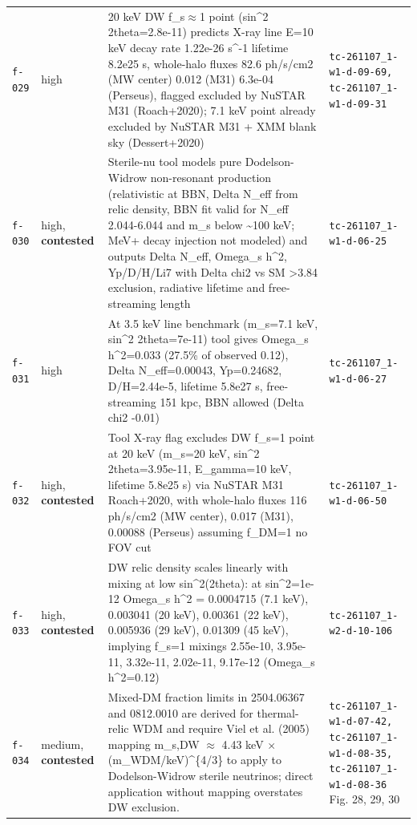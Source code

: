 \documentclass[11pt,a4paper]{article}
\begin{document}
\begin{longtable}{@{}p{}p{}p{}p{}@{}}
\texttt{f-029} & high & 20 keV DW f\_s$\approx$1 point (sin\textasciicircum{}2 2theta=2.8e-11) predicts X-ray line E=10 keV decay rate 1.22e-26 s\textasciicircum{}-1 lifetime 8.2e25 s, whole-halo fluxes 82.6 ph/s/cm2 (MW center) 0.012 (M31) 6.3e-04 (Perseus), flagged excluded by NuSTAR M31 (Roach+2020); 7.1 keV point already excluded by NuSTAR M31 + XMM blank sky (Dessert+2020) & \texttt{tc-261107\_\allowbreak{}1-w1-d-09-69,\allowbreak{} tc-261107\_\allowbreak{}1-w1-d-09-31} \\
\texttt{f-030} & high, \textbf{contested} & Sterile-nu tool models pure Dodelson-Widrow non-resonant production (relativistic at BBN, Delta N\_eff from relic density, BBN fit valid for N\_eff 2.044-6.044 and m\_s below \textasciitilde{}100 keV; MeV+ decay injection not modeled) and outputs Delta N\_eff, Omega\_s h\textasciicircum{}2, Yp/D/H/Li7 with Delta chi2 vs SM \textgreater{}3.84 exclusion, radiative lifetime and free-streaming length & \texttt{tc-261107\_\allowbreak{}1-w1-d-06-25} \\
\texttt{f-031} & high & At 3.5 keV line benchmark (m\_s=7.1 keV, sin\textasciicircum{}2 2theta=7e-11) tool gives Omega\_s h\textasciicircum{}2=0.033 (27.5\% of observed 0.12), Delta N\_eff=0.00043, Yp=0.24682, D/H=2.44e-5, lifetime 5.8e27 s, free-streaming 151 kpc, BBN allowed (Delta chi2 -0.01) & \texttt{tc-261107\_\allowbreak{}1-w1-d-06-27} \\
\texttt{f-032} & high, \textbf{contested} & Tool X-ray flag excludes DW f\_s=1 point at 20 keV (m\_s=20 keV, sin\textasciicircum{}2 2theta=3.95e-11, E\_gamma=10 keV, lifetime 5.8e25 s) via NuSTAR M31 Roach+2020, with whole-halo fluxes 116 ph/s/cm2 (MW center), 0.017 (M31), 0.00088 (Perseus) assuming f\_DM=1 no FOV cut & \texttt{tc-261107\_\allowbreak{}1-w1-d-06-50} \\
\texttt{f-033} & high, \textbf{contested} & DW relic density scales linearly with mixing at low sin\textasciicircum{}2(2theta): at sin\textasciicircum{}2=1e-12 Omega\_s h\textasciicircum{}2 = 0.0004715 (7.1 keV), 0.003041 (20 keV), 0.00361 (22 keV), 0.005936 (29 keV), 0.01309 (45 keV), implying f\_s=1 mixings 2.55e-10, 3.95e-11, 3.32e-11, 2.02e-11, 9.17e-12 (Omega\_s h\textasciicircum{}2=0.12) & \texttt{tc-261107\_\allowbreak{}1-w2-d-10-106} \\
\texttt{f-034} & medium, \textbf{contested} & Mixed-DM fraction limits in 2504.06367 and 0812.0010 are derived for thermal-relic WDM and require Viel et al. (2005) mapping m\_s,DW $\approx$ 4.43 keV $\times$ (m\_WDM/keV)\textasciicircum{}\{4/3\} to apply to Dodelson-Widrow sterile neutrinos; direct application without mapping overstates DW exclusion. & \texttt{tc-261107\_\allowbreak{}1-w1-d-07-42,\allowbreak{} tc-261107\_\allowbreak{}1-w1-d-08-35,\allowbreak{} tc-261107\_\allowbreak{}1-w1-d-08-36} Fig. 28, 29, 30 \\

\end{longtable}
\end{document}

